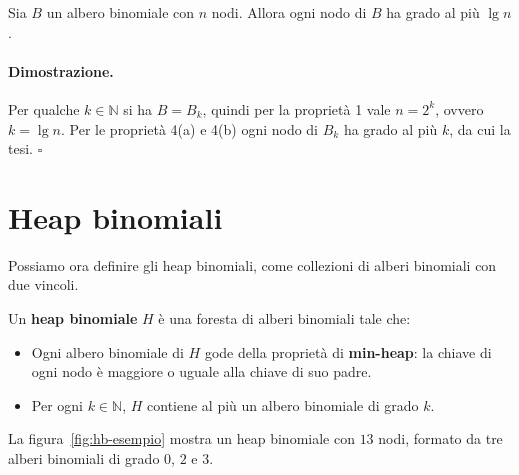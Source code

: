 \begin{corollario}\label{cor:hb-grado}
Sia $B$ un albero binomiale con $n$ nodi. Allora ogni nodo di $B$ ha grado al più $\lg n$.
\end{corollario}

\paragraph{Dimostrazione.}
Per qualche $k \in \mathbb{N}$ si ha $B = B_k$, quindi per la proprietà 1 vale $n = 2^k$, ovvero $k = \lg n$. Per le proprietà 4(a) e 4(b) ogni nodo di $B_k$ ha grado al più $k$, da cui la tesi. \hfill $\square$

\section{Heap binomiali}\label{sec:hb-heap}
Possiamo ora definire gli heap binomiali, come collezioni di alberi binomiali con due vincoli.

\begin{definizione}\label{def:heap-binomiale}
Un \textbf{heap binomiale} $H$ è una foresta di alberi binomiali tale che:
\begin{itemize}
    \item Ogni albero binomiale di $H$ gode della proprietà di \textbf{min-heap}: la chiave di ogni nodo è maggiore o uguale alla chiave di suo padre.
    \item Per ogni $k \in \mathbb{N}$, $H$ contiene al più un albero binomiale di grado $k$.
\end{itemize}
\end{definizione}

La figura~\ref{fig:hb-esempio} mostra un heap binomiale con $13$ nodi, formato da tre alberi binomiali di grado $0$, $2$ e $3$.

